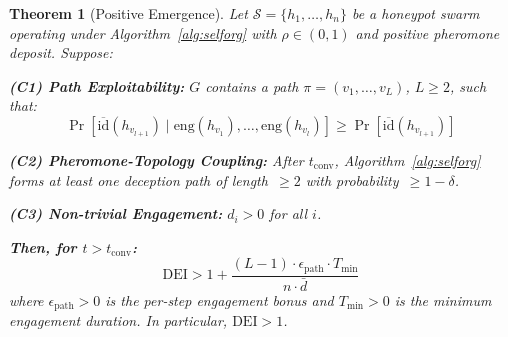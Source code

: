 \documentclass[review,3p,twocolumn]{elsarticle}
\newtheorem{theorem}{Theorem}
\newcommand{\calS}{\mathcal{S}}
\newcommand{\DEI}{\mathrm{DEI}}
\begin{document}
\begin{theorem}[Positive Emergence]
\label{thm:emergence}
Let $\calS = \{h_1, \ldots, h_n\}$ be a honeypot swarm operating under Algorithm~\ref{alg:selforg} with $\rho \in (0,1)$ and positive pheromone deposit. Suppose:

\noindent\textbf{(C1) Path Exploitability:} $G$ contains a path $\pi = (v_1, \ldots, v_L)$, $L \geq 2$, such that:
\begin{equation}
\Pr[\overline{\mathrm{id}}(h_{v_{l+1}}) \mid \mathrm{eng}(h_{v_1}), \ldots, \mathrm{eng}(h_{v_l})] \geq \Pr[\overline{\mathrm{id}}(h_{v_{l+1}})]
\end{equation}

\noindent\textbf{(C2) Pheromone-Topology Coupling:} After $t_{\mathrm{conv}}$, Algorithm~\ref{alg:selforg} forms at least one deception path of length~$\geq 2$ with probability~$\geq 1{-}\delta$.

\noindent\textbf{(C3) Non-trivial Engagement:} $d_i > 0$ for all $i$.

\noindent\textbf{Then, for $t > t_{\mathrm{conv}}$:}
\begin{equation}
\label{eq:dei_bound}
\DEI > 1 + \frac{(L-1) \cdot \epsilon_{\mathrm{path}} \cdot T_{\min}}{n \cdot \bar{d}}
\end{equation}
where $\epsilon_{\mathrm{path}} > 0$ is the per-step engagement bonus and $T_{\min} > 0$ is the minimum engagement duration. In particular, $\DEI > 1$.
\end{theorem}
\end{document}
